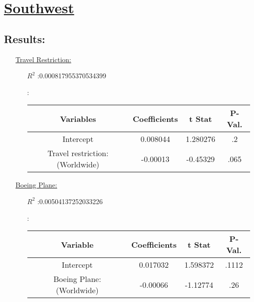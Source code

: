 \documentclass[12pt]{report}
\begin{document}
\section*{\underline{Southwest}}
\subsection*{Results:}
\begin{enumerate}
    \item[\underline{Travel Restriction:}]
        \begin{enumerate}
            \item[$R^2$]:0.000817955370534399
            \item[]:

                \begin{tabular}{|c|c|c|c|}
                    \toprule\hline
                    \textbf{Variables} & \textbf{Coefficients} & \textbf{t Stat} &\textbf{P-Val.} \\\hline

                    Intercept & 0.008044 & 1.280276 &.2 \\\hline
                    Travel restriction:(Worldwide) & -0.00013 & -0.45329 &.065\\\hline
                    \bottomrule
                \end{tabular}




        \end{enumerate}
    \item[\underline{Boeing Plane:}]
        \begin{enumerate}
            \item[$R^2$]:0.00504137252033226
            \item[]:

                \begin{tabular}{|c|c|c|c|}
                    \toprule\hline
                    \textbf{Variable} & \textbf{Coefficients} & \textbf{t Stat}&\textbf{P-Val.} \\ \hline

                    Intercept & 0.017032 & 1.598372 &.1112 \\ \hline
                    Boeing Plane: (Worldwide) & -0.00066 & -1.12774 & .26\\ \hline
                    \bottomrule
                \end{tabular}





\end{enumerate}
\end{enumerate}
\end{document}
